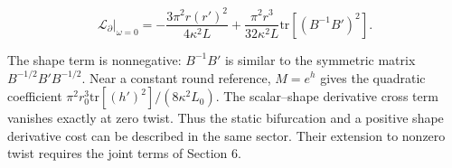 \begin{equation}\tag{T6}\label{eq:T6}
\mathcal L_{\partial}\big|_{\omega=0}
=-\frac{3\pi^2r(r')^2}{4\kappa^2L}
+\frac{\pi^2r^3}{32\kappa^2L}
\mathrm{tr}\!\left[(B^{-1}B')^2\right].
\end{equation}

The shape term is nonnegative: $B^{-1}B'$ is similar to the symmetric matrix $B^{-1/2}B'B^{-1/2}$. Near a constant round reference, $M=e^h$ gives the quadratic coefficient $\pi^2r_0^3\mathrm{tr}[(h')^2]/(8\kappa^2L_0)$. The scalar--shape derivative cross term vanishes exactly at zero twist. Thus the static bifurcation and a positive shape derivative cost can be described in the same sector. Their extension to nonzero twist requires the joint terms of Section 6.
